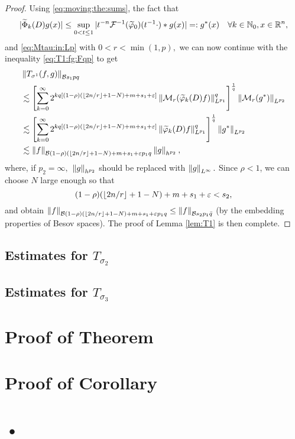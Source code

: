 \begin{proof}
Using  \eqref{eq:moving:the:sums},  the fact that  
\begin{equation}\label{def:g*}
|\widetilde{\Phi}_k(D)g(x)| \leq \sup\limits_{0 < t \le 1} |t^{-n}\mathcal{F}^{-1}(\widetilde{\varphi}_0)(t^{-1} \cdot)* g(x)| =: g^*(x) \quad \forall k \in \mathbb{N}_0,  x \in {{\mathbb R}^n}, 
\end{equation}
and \eqref{eq:Mtau:in:Lp} with $0<r < \min(1,p),$ we can now continue with the inequality \eqref{eq:T1:fg:Fqp} to get
\begin{align*}
& \left\|T_{\sigma^1}(f,g)\right\|_{\mathcal{B}{s_1}{p}{q}}\\
&  \lesssim   \left[  \sum\limits_{k=0}^\infty   2^{k q [(1-\rho)( \lfloor{2n/r}\rfloor + 1-N) + m+s_1+\varepsilon]}  \left\| \mathcal{M}_r(\widetilde{\varphi}_k(D)f)\right\|_{L^{p_1}}^q \right]^\frac{1}{q} \left\|\mathcal{M}_r(g^*)\right\|_{L^{p_2}}\\
&  \lesssim   \left[  \sum\limits_{k=0}^\infty   2^{k q [(1-\rho)( \lfloor{2n/r}\rfloor + 1-N) + m+s_1+\varepsilon]}   \left\|\widetilde{\varphi}_k(D)f\right\|_{L^{p_1}}^q \right]^\frac{1}{q} \left\|g^*\right\|_{L^{p_2}}\\
& \lesssim \left\|f\right\|_{\mathcal{B}{(1-\rho)( \lfloor{2n/r}\rfloor + 1-N) + m + s_1+\varepsilon }{p_1}{q}}  \left\| g\right\|_{h^{p_2}},
\end{align*}
 where, if $p_2=\infty,$  $\left\|g\right\|_{h^{p_2}}$ should be replaced with $\left\|g\right\|_{L^\infty}.$ Since $\rho<1$, we can choose $N$ large enough so that
$$
(1-\rho)( \lfloor{2n/r}\rfloor + 1-N) + m +s_1 +\varepsilon  < s_2,
$$
and obtain $ \left\|f\right\|_{\mathcal{B}{(1-\rho)( \lfloor{2n/r}\rfloor + 1-N) + m +s_1+ \varepsilon }{p_1}{q}} \leq  \left\|f\right\|_{\mathcal{B}{s_2}{p_1}{\bar{q}}}$ (by the embedding properties of Besov spaces). The proof of Lemma \ref{lem:T1} is then complete.

\end{proof}

\subsection{Estimates for $T_{\sigma_2}$}

\subsection{Estimates for $T_{\sigma_3}$}


\section{Proof of Theorem }

\section{Proof of Corollary }


\section{•}


